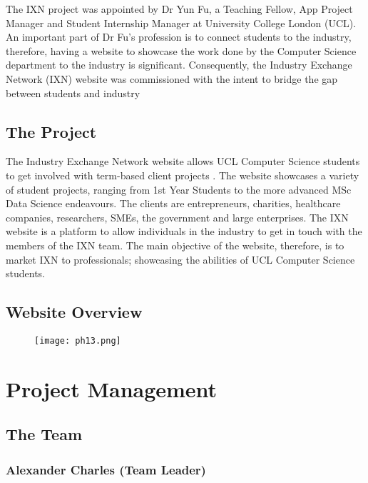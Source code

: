 \documentclass[fontsize=10pt]{extarticle}
\numberwithin{figure}{section} %
\begin{document}
The IXN project was appointed by Dr Yun Fu, a Teaching Fellow, App
Project Manager and Student Internship Manager at University College
London (UCL). An important part of Dr Fu's profession is to connect
students to the industry, therefore, having a website to showcase the
work done by the Computer Science department to the industry is
significant. Consequently, the Industry Exchange Network (IXN) website
was commissioned with the intent to bridge the gap between students and
industry

\hypertarget{the-project}{%
\subsection{The Project}\label{the-project}}

The Industry Exchange Network website allows UCL Computer Science
students to get involved with term-based client projects \cite{g1}. The
website showcases a variety of student projects, ranging from 1st Year
Students to the more advanced MSc Data Science endeavours. The clients
are entrepreneurs, charities, healthcare companies, researchers, SMEs,
the government and large enterprises. The IXN website is a platform to
allow individuals in the industry to get in touch with the members of
the IXN team. The main objective of the website, therefore, is to market
IXN to professionals; showcasing the abilities of UCL Computer Science
students.

\hypertarget{website-overview}{%
\subsection{Website Overview}\label{website-overview}}

\begin{figure}[H]
      \centering
      \texttt{[image: ph13.png]}
 \end{figure}

\hypertarget{project-management}{%
\section{Project Management}\label{project-management}}

\hypertarget{the-team}{%
\subsection{The Team}\label{the-team}}

\hypertarget{alexander-charles-team-leader}{%
\subsubsection{Alexander Charles (Team
Leader)}\label{alexander-charles-team-leader}}
\end{document}
